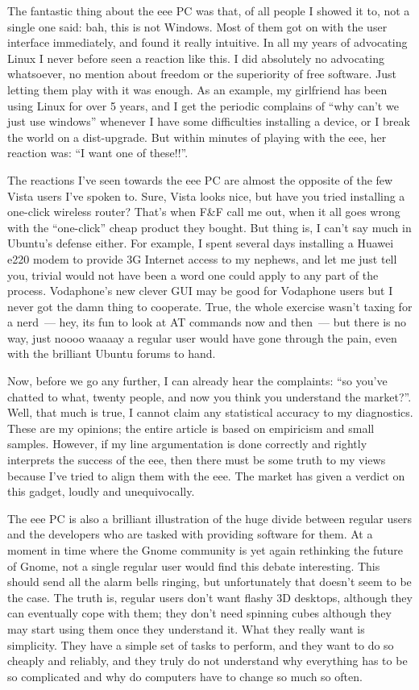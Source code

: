 \documentclass{memoir}
\begin{document}
The fantastic thing about the eee PC was that, of all people I showed
it to, not a single one said: bah, this is not Windows. Most of them
got on with the user interface immediately, and found it really
intuitive. In all my years of advocating Linux I never before seen a
reaction like this. I did absolutely no advocating whatsoever, no
mention about freedom or the superiority of free software. Just
letting them play with it was enough. As an example, my girlfriend has
been using Linux for over 5 years, and I get the periodic complains of
``why can't we just use windows'' whenever I have some difficulties
installing a device, or I break the world on a dist-upgrade. But
within minutes of playing with the eee, her reaction was: ``I want one
of these!!''.

The reactions I've seen towards the eee PC are almost the opposite of
the few Vista users I've spoken to. Sure, Vista looks nice, but have
you tried installing a one-click wireless router? That's when F\&F call
me out, when it all goes wrong with the ``one-click'' cheap product they
bought. But thing is, I can't say much in Ubuntu's defense either. For
example, I spent several days installing a Huawei e220 modem to
provide 3G Internet access to my nephews, and let me just tell you,
trivial would not have been a word one could apply to any part of the
process. Vodaphone's new clever GUI may be good for Vodaphone users
but I never got the damn thing to cooperate. True, the whole exercise
wasn't taxing for a nerd~--- hey, its fun to look at AT commands now and
then~--- but there is no way, just noooo waaaay a regular user would
have gone through the pain, even with the brilliant Ubuntu forums to
hand.

Now, before we go any further, I can already hear the complaints: ``so
you've chatted to what, twenty people, and now you think you
understand the market?''. Well, that much is true, I cannot claim any
statistical accuracy to my diagnostics. These are my opinions; the
entire article is based on empiricism and small samples. However, if
my line argumentation is done correctly and rightly interprets the
success of the eee, then there must be some truth to my views because
I've tried to align them with the eee. The market has given a verdict
on this gadget, loudly and unequivocally.

The eee PC is also a brilliant illustration of the huge divide between
regular users and the developers who are tasked with providing
software for them. At a moment in time where the Gnome community is
yet again rethinking the future of Gnome, not a single regular user
would find this debate interesting. This should send all the alarm
bells ringing, but unfortunately that doesn't seem to be the case. The
truth is, regular users don't want flashy 3D desktops, although they
can eventually cope with them; they don't need spinning cubes although
they may start using them once they understand it. What they really
want is simplicity. They have a simple set of tasks to perform, and
they want to do so cheaply and reliably, and they truly do not
understand why everything has to be so complicated and why do
computers have to change so much so often.
\end{document}
